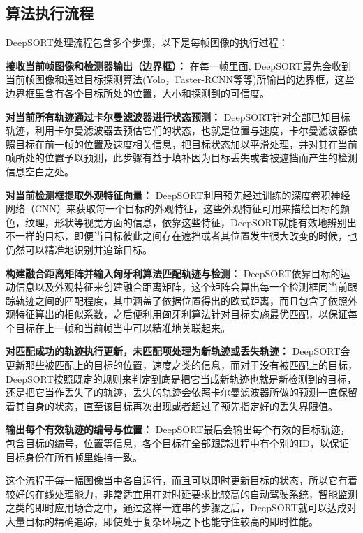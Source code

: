 \subsection{算法执行流程}

DeepSORT处理流程包含多个步骤，以下是每帧图像的执行过程：

\textbf{接收当前帧图像和检测器输出（边界框）： }在每一帧里面, DeepSORT最先会收到当前帧图像和通过目标探测算法(Yolo，Faster-RCNN等等)所输出的边界框，这些边界框里含有各个目标所处的位置，大小和探测到的可信度。

\textbf{对当前所有轨迹通过卡尔曼滤波器进行状态预测： }DeepSORT针对全部已知目标轨迹，利用卡尔曼滤波器去预估它们的状态，也就是位置与速度，卡尔曼滤波器依照目标在前一帧的位置及速度相关信息，把目标状态加以平滑处理，并对其在当前帧所处的位置予以预测，此步骤有益于填补因为目标丢失或者被遮挡而产生的检测信息空白之处。

\textbf{对当前检测框提取外观特征向量： }DeepSORT利用预先经过训练的深度卷积神经网络（CNN）来获取每一个目标的外观特征，这些外观特征可用来描绘目标的颜色，纹理，形状等视觉方面的信息，依靠这些特征，DeepSORT就能有效地辨别出不一样的目标，即便当目标彼此之间存在遮挡或者其位置发生很大改变的时候，也仍然可以精准地识别并追踪目标。

\textbf{构建融合距离矩阵并输入匈牙利算法匹配轨迹与检测： }DeepSORT依靠目标的运动信息以及外观特征来创建融合距离矩阵，这个矩阵会算出每一个检测框同当前跟踪轨迹之间的匹配程度，其中涵盖了依据位置得出的欧式距离，而且包含了依照外观特征算出的相似系数，之后便利用匈牙利算法针对目标实施最优匹配，以保证每个目标在上一帧和当前帧当中可以精准地关联起来。

\textbf{对匹配成功的轨迹执行更新，未匹配项处理为新轨迹或丢失轨迹： }DeepSORT会更新那些被匹配上的目标的位置，速度之类的信息，而对于没有被匹配上的目标，DeepSORT按照既定的规则来判定到底是把它当成新轨迹也就是新检测到的目标，还是把它当作丢失了的轨迹，丢失的轨迹会依照卡尔曼滤波器所做的预测一直保留着其自身的状态，直至该目标再次出现或者超过了预先指定好的丢失界限值。

\textbf{输出每个有效轨迹的编号与位置： }DeepSORT最后会输出每个有效的目标轨迹，包含目标的编号，位置等信息，各个目标在全部跟踪进程中有个别的ID，以保证目标身份在所有帧里维持一致。

这个流程于每一幅图像当中各自运行，而且可以即时更新目标的状态，所以它有着较好的在线处理能力，非常适宜用在对时延要求比较高的自动驾驶系统，智能监测之类的即时应用场合之中，通过这样一连串的步骤之后，DeepSORT就可以达成对大量目标的精确追踪，即使处于复杂环境之下也能守住较高的即时性能。

